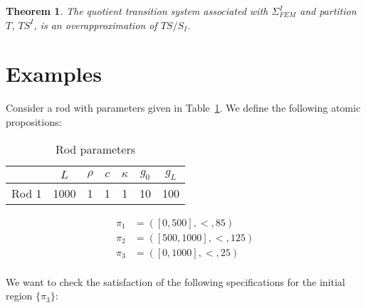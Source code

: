 \documentclass{article}
\newtheorem{theorem}{Theorem}
\newtheorem{definition}{Definition}
\newtheorem{problem}{Problem}
\newcommand*{\fran}[1]{\textcolor{blue}{#1}}
\begin{document}
%
%
%
%
%     
%

\begin{theorem}

The quotient transition system associated with $\Sigma_{FEM}^I$ and
partition $T$, $TS^I$, is an overapproximation of $TS/S_I$.
    
\end{theorem}

\section{Examples}
\label{sec:examples}

Consider a rod with parameters given in Table~\ref{tab:ex_pars}. We define
the following atomic propositions: 

\begin{table}
\centering
\begin{tabular}{|c|c|c|c|c|c|c|}
    \hline
    & $L$ & $\rho$ & $c$ & $\kappa$ & $g_0$ & $g_L$ \\
    \hline
    Rod 1 & 1000 & 1 & 1 & 1 & 10 & 100 \\
    \hline
\end{tabular}
\caption{Rod parameters}
\label{tab:ex_pars}
\end{table}

\begin{equation}
    \begin{aligned}
        \pi_1 &= ([0, 500], <, 85) \\
        \pi_2 &= ([500, 1000], <, 125) \\
        \pi_3 &= ([0, 1000], <, 25) \\
    \end{aligned}
\end{equation}

We want to check the satisfaction of the following specifications for the
initial region $\{\pi_3\}$:
\end{document}
